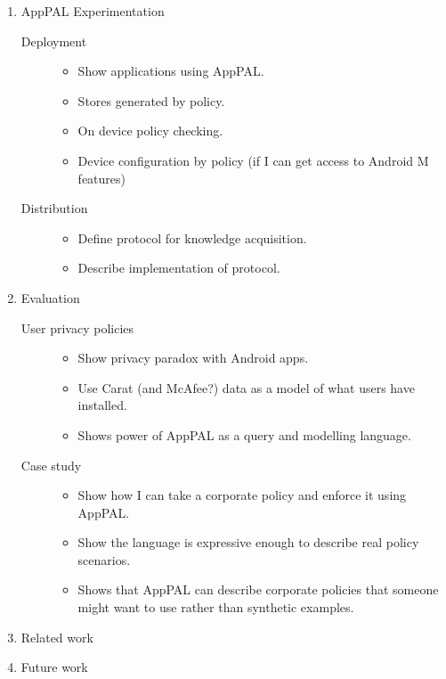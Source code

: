 \documentclass[a4paper]{scrartcl}
\begin{document}
\begin{enumerate}
  \item AppPAL Experimentation
    \begin{description}
      \item[Deployment]
        \hfill
        \begin{itemize}
          \item Show applications using AppPAL.
          \item Stores generated by policy.
          \item On device policy checking.
          \item Device configuration by policy (if I can get access to Android M features)
        \end{itemize}
      \item[Distribution]
        \hfill
        \begin{itemize}
          \item Define protocol for knowledge acquisition.
          \item Describe implementation of protocol.
        \end{itemize}
    \end{description}
  \item Evaluation
    \begin{description}
      \item[User privacy policies]
        \hfill
        \begin{itemize}
          \item Show privacy paradox with Android apps.
          \item Use Carat (and McAfee?) data as a model of what users have installed.
          \item Shows power of AppPAL as a query and modelling language.
        \end{itemize}
      \item[Case study]
        \hfill
        \begin{itemize}
          \item Show how I can take a corporate policy and enforce it using AppPAL.
          \item Show the language is expressive enough to describe real policy scenarios.
          \item Shows that AppPAL can describe corporate policies that someone might want to use rather than synthetic examples.
        \end{itemize}
    \end{description}
  \item Related work
  \item Future work
\end{enumerate}
\end{document}

